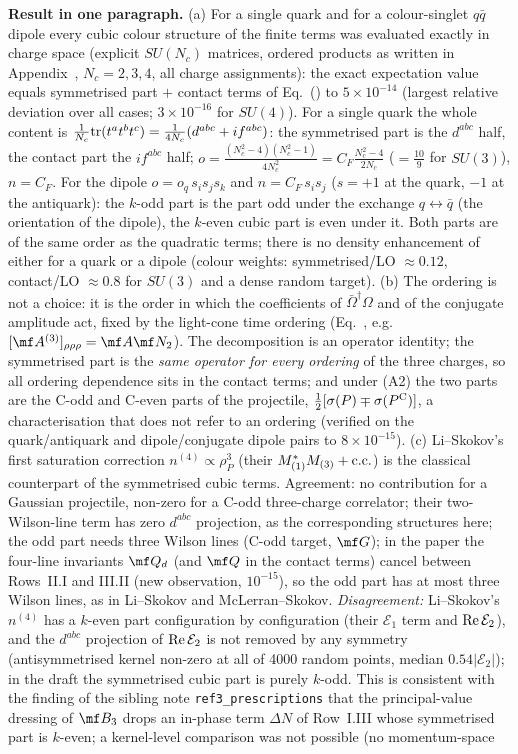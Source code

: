 \noindent\textbf{Result in one paragraph.}
(a) For a single quark and for a colour-singlet $q\bar q$ dipole every cubic colour structure of the finite terms was evaluated exactly in charge space (explicit $SU(N_c)$ matrices, ordered products as written in Appendix~, $N_c=2,3,4$, all charge assignments): the exact expectation value equals symmetrised part $+$ contact terms of Eq.~() to $5\times10^{-14}$ (largest relative deviation over all cases; $3\times10^{-16}$ for $SU(4)$). For a single quark the whole content is $\frac1{N_c}{\rm tr}(t^at^bt^c)=\frac{1}{4N_c}(d^{abc}+if^{abc})$: the symmetrised part is the $d^{abc}$ half, the contact part the $if^{abc}$ half; $o=\frac{(N_c^2-4)(N_c^2-1)}{4N_c^2}=C_F\frac{N_c^2-4}{2N_c}$ ($=\frac{10}{9}$ for $SU(3)$), $n=C_F$. For the dipole $o=o_q\,s_is_js_k$ and $n=C_F\,s_is_j$ ($s=+1$ at the quark, $-1$ at the antiquark): the $k$-odd part is the part odd under the exchange $q\leftrightarrow\bar q$ (the orientation of the dipole), the $k$-even cubic part is even under it. Both parts are of the same order as the quadratic terms; there is no density enhancement of either for a quark or a dipole (colour weights: symmetrised/LO $\approx0.12$, contact/LO $\approx0.8$ for $SU(3)$ and a dense random target). (b) The ordering is not a choice: it is the order in which the coefficients of $\bar\Omega^\dagger\Omega$ and of the conjugate amplitude act, fixed by the light-cone time ordering (Eq.~, e.g.\ $[\mf A^{(3)}]_{\rho\rho\rho}=\mf A\mf N_2$). The decomposition is an operator identity; the symmetrised part is the \emph{same operator for every ordering} of the three charges, so all ordering dependence sits in the contact terms; and under (A2) the two parts are the C-odd and C-even parts of the projectile, $\frac12[\sigma(P)\mp\sigma(P^{\rm C})]$, a characterisation that does not refer to an ordering (verified on the quark/antiquark and dipole/conjugate dipole pairs to $8\times10^{-15}$). (c) Li--Skokov's first saturation correction $n^{(4)}\propto\rho_P^3$ (their $M_{(1)}^*M_{(3)}+{\rm c.c.}$) is the classical counterpart of the symmetrised cubic terms. Agreement: no contribution for a Gaussian projectile, non-zero for a C-odd three-charge correlator; their two-Wilson-line term has zero $d^{abc}$ projection, as the corresponding structures here; the odd part needs three Wilson lines (C-odd target, $\mf G$); in the paper the four-line invariants $\mf Q_d$ (and $\mf Q$ in the contact terms) cancel between Rows~II.I and III.II (new observation, $10^{-15}$), so the odd part has at most three Wilson lines, as in Li--Skokov and McLerran--Skokov. \emph{Disagreement:} Li--Skokov's $n^{(4)}$ has a $k$-even part configuration by configuration (their $\mathcal E_1$ term and ${\rm Re}\,\mathcal E_2$), and the $d^{abc}$ projection of ${\rm Re}\,\mathcal E_2$ is not removed by any symmetry (antisymmetrised kernel non-zero at all of 4000 random points, median $0.54|\mathcal E_2|$); in the draft the symmetrised cubic part is purely $k$-odd. This is consistent with the finding of the sibling note \texttt{ref3\_prescriptions} that the principal-value dressing of $\mf B_3$ drops an in-phase term $\Delta N$ of Row~I.III whose symmetrised part is $k$-even; a kernel-level comparison was not possible (no momentum-space 